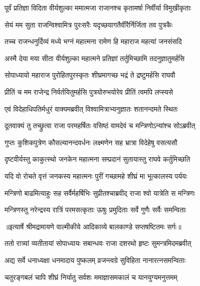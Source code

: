 \twolineshloka
{पूर्वं प्रतिज्ञा विदिता वीर्यशुल्का ममात्मजा}
{राजानश्च कृतामर्षा निर्वीर्या विमुखीकृताः} %

\twolineshloka
{सेयं मम सुता राजन्विश्वामित्र पुरःसरैः}
{यदृच्छयागतैर्वीरैर्निर्जिता तव पुत्रकैः} %

\twolineshloka
{तच्च राजन्धनुर्दिव्यं मध्ये भग्नं महात्मना}
{रामेण हि महाराज महत्यां जनसंसदि} %

\twolineshloka
{अस्मै देया मया सीता वीर्यशुल्का महात्मने}
{प्रतिज्ञां तर्तुमिच्छामि तदनुज्ञातुमर्हसि} %

\twolineshloka
{सोपाध्यायो महाराज पुरोहितपुरस्कृतः}
{शीघ्रमागच्छ भद्रं ते द्रष्टुमर्हसि राघवौ} %

\twolineshloka
{प्रीतिं च मम राजेन्द्र निर्वर्तयितुमर्हसि}
{पुत्रयोरुभयोरेव प्रीतिं त्वमपि लप्स्यसे} %

\twolineshloka
{एवं विदेहाधिपतिर्मधुरं वाक्यमब्रवीत्}
{विश्वामित्राभ्यनुज्ञातः शतानन्दमते स्थितः} %

\twolineshloka
{दूतवाक्यं तु तच्छ्रुत्वा राजा परमहर्षितः}
{वसिष्ठं वामदेवं च मन्त्रिणोऽन्यांश्च सोऽब्रवीत्} %

\twolineshloka
{गुप्तः कुशिकपुत्रेण कौसल्यानन्दवर्धनः}
{लक्ष्मणेन सह भ्रात्रा विदेहेषु वसत्यसौ} %

\twolineshloka
{दृष्टवीर्यस्तु काकुत्स्थो जनकेन महात्मना}
{सम्प्रदानं सुतायास्तु राघवे कर्तुमिच्छति} %

\twolineshloka
{यदि वो रोचते वृत्तं जनकस्य महात्मनः}
{पुरीं गच्छामहे शीघ्रं मा भूत्कालस्य पर्ययः} %

\twolineshloka
{मन्त्रिणो बाढमित्याहुः सह सर्वैर्महर्षिभिः}
{सुप्रीतश्चाब्रवीद् राजा श्वो यात्रेति स मन्त्रिणः} %

\twolineshloka
{मन्त्रिणस्तु नरेन्द्रस्य रात्रिं परमसत्कृताः}
{ऊषुः प्रमुदिताः सर्वे गुणैः सर्वैः समन्विताः} %


{॥इत्यार्षे श्रीमद्रामायणे वाल्मीकीये आदिकाव्ये बालकाण्डे सप्तषष्टितमः सर्गः॥}


\twolineshloka
{ततो रात्र्यां व्यतीतायां सोपाध्यायः सबान्धवः}
{राजा दशरथो हृष्टः सुमन्त्रमिदमब्रवीत्} %

\twolineshloka
{अद्य सर्वे धनाध्यक्षा धनमादाय पुष्कलम्}
{व्रजन्त्वग्रे सुविहिता नानारत्नसमन्विताः} %

\twolineshloka
{चतुरङ्गबलं चापि शीघ्रं निर्यातु सर्वशः}
{ममाज्ञासमकालं च यानयुग्यमनुत्तमम्} %

